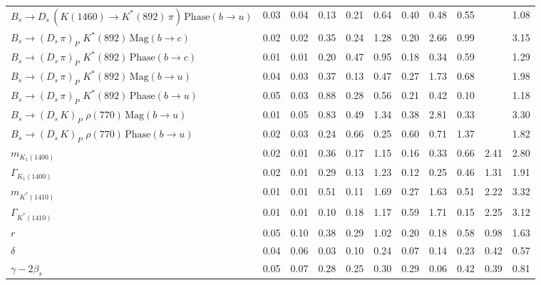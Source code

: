 \begin{tabular}{l  c  c  c  c  c  c  c  c  c  | c }
$B_s \to D_s \, ( K(1460) \to K^{*}(892) \, \pi ) \, \text{Phase} (b \to u)$ & 0.03 & 0.04 & 0.13 & 0.21 & 0.64 & 0.40 & 0.48 & 0.55 &  & 1.08 \\ 
$B_s \to ( D_s \, \pi)_{P} \, \, K^{*}(892) \, \text{Mag} (b \to c)$ & 0.02 & 0.02 & 0.35 & 0.24 & 1.28 & 0.20 & 2.66 & 0.99 &  & 3.15 \\ 
$B_s \to ( D_s \, \pi)_{P} \, \, K^{*}(892) \, \text{Phase} (b \to c)$ & 0.01 & 0.01 & 0.20 & 0.47 & 0.95 & 0.18 & 0.34 & 0.59 &  & 1.29 \\ 
$B_s \to ( D_s \, \pi)_{P} \, \, K^{*}(892) \, \text{Mag} (b \to u)$ & 0.04 & 0.03 & 0.37 & 0.13 & 0.47 & 0.27 & 1.73 & 0.68 &  & 1.98 \\ 
$B_s \to ( D_s \, \pi)_{P} \, \, K^{*}(892) \, \text{Phase} (b \to u)$ & 0.05 & 0.03 & 0.88 & 0.28 & 0.56 & 0.21 & 0.42 & 0.10 &  & 1.18 \\ 
$B_s \to ( D_s \, K)_{P} \, \, \rho(770) \, \text{Mag} (b \to u)$ & 0.01 & 0.05 & 0.83 & 0.49 & 1.34 & 0.38 & 2.81 & 0.33 &  & 3.30 \\ 
$B_s \to ( D_s \, K)_{P} \, \, \rho(770) \, \text{Phase} (b \to u)$ & 0.02 & 0.03 & 0.24 & 0.66 & 0.25 & 0.60 & 0.71 & 1.37 &  & 1.82 \\ 
$m_{K_1(1400)} $ & 0.02 & 0.01 & 0.36 & 0.17 & 1.15 & 0.16 & 0.33 & 0.66 & 2.41 & 2.80 \\ 
$\Gamma_{K_1(1400)}$ & 0.02 & 0.01 & 0.29 & 0.13 & 1.23 & 0.12 & 0.25 & 0.46 & 1.31 & 1.91 \\ 
$m_{K^{*}(1410)}$ & 0.01 & 0.01 & 0.51 & 0.11 & 1.69 & 0.27 & 1.63 & 0.51 & 2.22 & 3.32 \\ 
$\Gamma_{K^{*}(1410)}$ & 0.01 & 0.01 & 0.10 & 0.18 & 1.17 & 0.59 & 1.71 & 0.15 & 2.25 & 3.12 \\ 
$r$ & 0.05 & 0.10 & 0.38 & 0.29 & 1.02 & 0.20 & 0.18 & 0.58 & 0.98 & 1.63 \\ 
$\delta$ & 0.04 & 0.06 & 0.03 & 0.10 & 0.24 & 0.07 & 0.14 & 0.23 & 0.42 & 0.57 \\ 
$\gamma - 2 \beta_{s}$ & 0.05 & 0.07 & 0.28 & 0.25 & 0.30 & 0.29 & 0.06 & 0.42 & 0.39 & 0.81 \\ 
\hline
\hline
\end{tabular}
